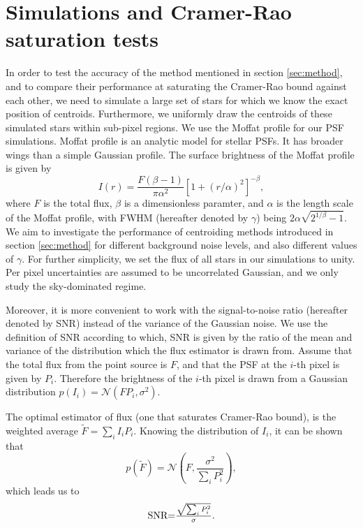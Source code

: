\documentclass[12pt, preprint]{aastex}
\newcommand{\beq}{\begin{equation}}
\newcommand{\eeq}{\end{equation}}
\begin{document}
\section{Simulations and Cramer-Rao saturation tests}\label{sec:data}

In order to test the accuracy of the method mentioned in section \ref{sec:method},
 and to compare their performance at saturating the Cramer-Rao bound against each other, 
we need to simulate a large set of stars for which we know the exact position of centroids.
Furthermore, we uniformly draw the centroids of these simulated stars within sub-pixel regions. 
We use the Moffat profile \citep{moffat} for our PSF simulations. 
Moffat profile is an analytic model for stellar PSFs. It has broader wings than
a simple Gaussian profile. The surface brightness of the Moffat profile is given by
\beq
I(r) = \frac{F(\beta -1)}{\pi \alpha^{2}}[1+(r/\alpha)^{2}]^{-\beta},
\label{mof}
\eeq
where $F$ is the total flux, $\beta$ is a dimensionless paramter, and $\alpha$ is
the length scale of the Moffat profile, with FWHM (hereafter denoted by $\gamma$)
being $2\alpha\sqrt{2^{1/\beta}-1}$. 
We aim to investigate the performance of centroiding methods introduced
in section \ref{sec:method} for different background noise levels, and also different
values of $\gamma$. For further simplicity, we set the flux of all stars in our
simulations to unity. Per pixel uncertainties are assumed to be uncorrelated Gaussian,
and we only study the sky-dominated regime.

Moreover, it is more convenient to work with the signal-to-noise ratio
(hereafter denoted by SNR) instead of the variance of the Gaussian noise.
We use the definition of SNR according to which, SNR is given by the ratio
 of the mean and variance of the distribution
which the flux estimator is drawn from. Assume that the total flux from
the point source is $F$, and that the PSF at the $i$-th pixel is given
by $P_{i}$. Therefore the brightness of the $i$-th pixel is drawn from
a Gaussian distribution $p(I_{i}) = \mathcal{N}(FP_{i},\sigma^{2})$. 

The optimal estimator of flux (one that saturates Cramer-Rao bound),
is the weighted average $\tilde{F}=\sum_{i}I_{i}P_{i}$. Knowing the
distribution of $I_{i}$, it can be shown that 
\beq
p(\tilde{F}) = \mathcal{N}(F , \frac{\sigma^{2}}{\sum_{i}P_{i}^{2}}),
\eeq  
which leads us to
\beq
\begin{array}{l}
\text{SNR} $=$ \frac{\sqrt{\sum_{i} P_{i}^{2}}}{\sigma}.
\end{array}
\label{snr}
\eeq
\end{document}
